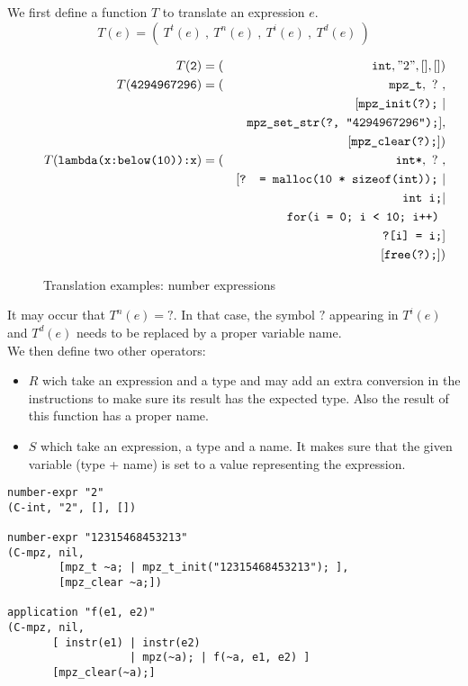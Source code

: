 \documentclass[12pt,a4paper]{article}
\newcommand{\cl}[1]{\texttt{#1}}
\begin{document}
We first define a function $T$ to translate an expression $e$.
$$ T(e) = ( \ T^t(e) \ , \ T^n(e) \ , \ T^i(e) \ , \ T^d(e) \ ) $$

\begin{figure}[!ht]
\begin{eqnarray*}
T(\cl{2}) &= (& \cl{int}, "2", [], []) \\
T(\cl{4294967296}) &= (& \cl{mpz\_t}, \ ? \ , \\
&& [ \cl{mpz\_init(?);} \ | \\
&& \ \cl{mpz\_set\_str(?, "4294967296");} ],\\
&& [ \cl{mpz\_clear(?);} ]) \\
T(\cl{lambda(x:below(10)):x}) &= (& \cl{int*}, \ ? \ , \\
&& [ \cl{? = malloc(10 * sizeof(int));} \ | \\
&& \ \cl{int i;} | \\
&& \ \cl{for(i = 0; i < 10; i++) }\\
&& \ \ \ \cl{?[i] = i;}  ]\\
&& [ \cl{free(?);} ])
\end{eqnarray*}
\caption{Translation examples: number expressions}
\end{figure}

It may occur that $T^n(e) = ?$. In that case, the symbol $?$ appearing in $T^i(e)$ and $T^d(e)$ needs to be replaced by a proper variable name.\\

We then define two other operators:
\begin{itemize}
\item $R$ wich take an expression and a type and may add an extra conversion in the instructions to make sure its result has the expected type. Also the result of this function has a proper name.
\item $S$ which take an expression, a type and a name. It makes sure that the given variable (type + name) is set to a value representing the expression.
\end{itemize}






\begin{lstlisting}
number-expr "2"
(C-int, "2", [], [])

number-expr "12315468453213"
(C-mpz, nil,
        [mpz_t ~a; | mpz_t_init("12315468453213"); ],
        [mpz_clear ~a;])

application "f(e1, e2)"
(C-mpz, nil,
       [ instr(e1) | instr(e2)
                   | mpz(~a); | f(~a, e1, e2) ]
       [mpz_clear(~a);]
\end{lstlisting}
\end{document}
